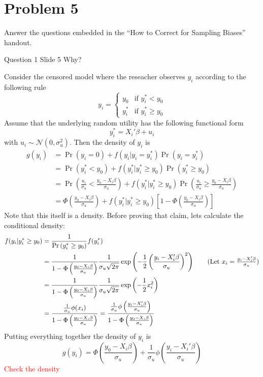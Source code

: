 \documentclass{article}
\begin{document}
\section*{Problem 5}
Answer the questions embedded in the ``How to Correct for Sampling Biases'' handout.

\begin{problem}{Question 1 Slide 5}
Why?
\end{problem}
\begin{solution}
Consider the censored model where the reseacher observes $y_i$ according to the following rule 
\begin{equation*}
    y_i = \begin{cases}
        y_0 &\mbox{if } y^*_i< y_0 \\ 
        y_i^* &\mbox{if } y^*_i\geq y_0
    \end{cases}
\end{equation*}
Assume that the underlying random utility has the following functional form
\begin{equation*}
 y_i^* = X_i'\beta + u_i
\end{equation*}
with $u_i\sim\mathcal{N}(0,\sigma_u^2)$. Then the density of $y_i$ is 
\begin{align*}
    g(y_i) &= \Pr(y_i=0) + f(y_i\vert y_i=y_i^*)\Pr(y_i = y_i^*) \\ 
    &= \Pr(y_i^*<y_0) + f(y_i^*\vert y_i^*\geq y_0)\Pr(y_i^*\geq y_0) \\
    &= \Pr\left(\frac{u_i}{\sigma_u}<\frac{y_0-X_i\beta}{\sigma_u}\right) + f(y_i^*\vert y_i^*\geq y_0)\Pr\left(\frac{u_i}{\sigma_u}\geq\frac{y_0-X_i\beta}{\sigma_u}\right) \\ 
    &= \Phi\left(\frac{y_0-X_i\beta}{\sigma_u}\right) + f(y_i^*\vert y_i^*\geq y_0)\left[1-\Phi\left(\frac{y_0-X_i\beta}{\sigma_u}\right)\right]
\end{align*}
Note that this itself is a density. Before proving that claim, lets calculate the conditional density:
\begin{align*}
    f(y_i\vert y_i^*\geq y_0) &= \frac{1}{\Pr\left(y_i^*\geq y_0\right)}f(y_i^*) \\ 
    &= \frac{1}{1-\Phi\left(\frac{y_0-X_i\beta}{\sigma_u}\right)} \frac{1}{\sigma_u\sqrt{2\pi}} \exp\left(-\frac{1}{2}\left(\frac{y_i-X_i'\beta}{\sigma_u}\right)^2\right) \tag{Let $x_i=\frac{y_i-X_i'\beta}{\sigma_u}$} \\ 
    &= \frac{1}{1-\Phi\left(\frac{y_0-X_i\beta}{\sigma_u}\right)} \frac{1}{\sigma_u\sqrt{2\pi}} \exp\left(-\frac{1}{2}x_i^2\right) \\
     &= \frac{\frac{1}{\sigma_u}\phi(x_i)}{1-\Phi\left(\frac{y_0-X_i\beta}{\sigma_u}\right)}
     = \frac{\frac{1}{\sigma_u}\phi\left(\frac{y_i-X_i'\beta}{\sigma_u}\right)}{1-\Phi\left(\frac{y_0-X_i\beta}{\sigma_u}\right)}
\end{align*}
Putting everything together the density of $y_i$ is 
\begin{equation}
    g(y_i) = \Phi\left(\frac{y_0-X_i\beta}{\sigma_u}\right) + \frac{1}{\sigma_u}\phi\left(\frac{y_i-X_i'\beta}{\sigma_u}\right)
\end{equation}
\textcolor{red}{Check the density}
\end{solution}
\end{document}

